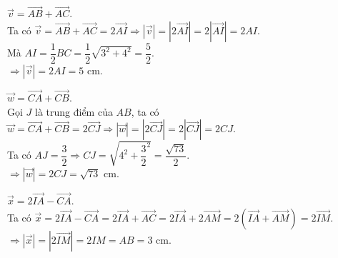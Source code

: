 \begin{bt}
{\begin{listEX}
			\item $\overrightarrow{v}=\overrightarrow{AB}+\overrightarrow{AC}$. \\
			Ta có $\overrightarrow{v}=\overrightarrow{AB}+\overrightarrow{AC}=2\overrightarrow{AI}\Rightarrow \left|\overrightarrow{v}\right|=\left|2\overrightarrow{AI}\right|=2\left|\overrightarrow{AI}\right|=2AI$.\\ 
			Mà $AI=\dfrac{1}{2}BC=\dfrac{1}{2}\sqrt{3^2+4^2}=\dfrac{5}{2}$.\\
			$\Rightarrow \left|\overrightarrow{v}\right|=2AI=5$ cm.
			\item $\overrightarrow{w}=\overrightarrow{CA}+\overrightarrow{CB}$. \\
			Gọi $J$ là trung điểm của $AB$, ta có\\
			$\overrightarrow{w}=\overrightarrow{CA}+\overrightarrow{CB}=2\overrightarrow{CJ}\Rightarrow \left|\overrightarrow{w}\right|=\left|2\overrightarrow{CJ}\right|=2\left|\overrightarrow{CJ}\right|=2CJ$.\\ 
			Ta có $AJ=\dfrac{3}{2}\Rightarrow CJ=\sqrt{4^2+{\dfrac{3}{2}}^2}=\dfrac{\sqrt{73}}{2}$.\\
			$\Rightarrow \left|\overrightarrow{w}\right|=2CJ=\sqrt{73}$ cm.
			\item $\overrightarrow{x}=2\overrightarrow{IA}-\overrightarrow{CA}$.\\
			Ta có $\overrightarrow{x}=2\overrightarrow{IA}-\overrightarrow{CA}=2\overrightarrow{IA}+\overrightarrow{AC}=2\overrightarrow{IA}+2\overrightarrow{AM}=2\left(\overrightarrow{IA}+\overrightarrow{AM} \right)=2\overrightarrow{IM}$.\\
			$\Rightarrow \left|\overrightarrow{x}\right|=\left|2\overrightarrow{IM}\right|=2IM=AB=3$ cm.
		\end{listEX}
	}
\end{bt}

